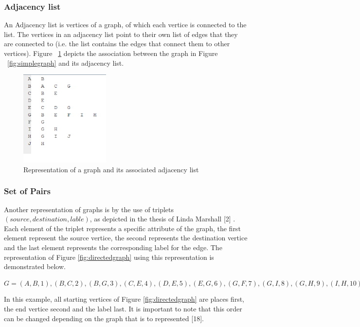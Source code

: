 \subsubsection{Adjacency list}
An Adjacency list is vertices of a graph, of which each vertice is connected to the list. The vertices in an adjacency list point to their own list of edges that they are connected to 
(i.e. the list contains the edges that connect them to other vertices).
Figure ~\ref{fig:adjacencylist} depicts the association between the graph in Figure ~\ref{fig:simplegraph} and its adjacency list.
\begin{figure}[H]
  \begin{center}
      \includegraphics[width=0.4\textwidth]{list.png}
  \end{center}    
  \caption{Representation of a graph and its associated adjacency list}
  \label{fig:adjacencylist}
\end{figure}

\subsubsection{Set of Pairs}
\label{Set of Pairs}
Another representation of graphs is by the use of triplets $(source,destination,lable)$, as depicted in the thesis of Linda Marshall [2] . 
Each element of the triplet represents a specific attribute of the graph, the first element represent the source vertice, the second represents 
the destination vertice and the last element represents the corresponding label for the edge. The representation of Figure \ref{fig:directedgraph} 
using this representation is demonstrated below.
\begin{myEnumerate}
  \item $G = {(A,B,1), (B,C,2), (B,G,3), (C,E,4), (D,E,5), (E,G,6), (G,F,7), (G,I,8),(G,H,9), (I,H,10), (H,I,11)}$
\end{myEnumerate}
In this example, all starting vertices of Figure \ref{fig:directedgraph} are places first, the end vertice second and the label last. It is important 
to note that this order can be changed depending on the graph that is to represented [18].


